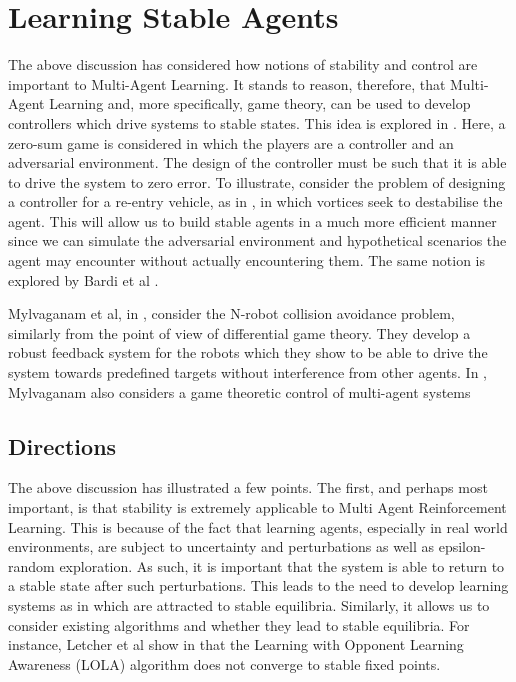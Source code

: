 \documentclass[preprint,8pt]{report}
\begin{document}
\section{Learning Stable Agents}

The above discussion has considered how notions of stability and control are important to Multi-Agent Learning. It stands to reason, therefore, that Multi-Agent Learning and, more specifically, game theory, can be used to develop controllers which drive systems to stable states. This idea is explored in \cite{Marden2018AnnualControl}. Here, a zero-sum game is considered in which the players are a controller and an adversarial environment. The design of the controller must be such that it is able to drive the system to zero error. To illustrate, consider the problem of designing a controller for a re-entry vehicle, as in \cite{Breitner1994ReentryGame}, in which vortices seek to destabilise the agent. This will allow us to build stable agents in a much more efficient manner since we can simulate the adversarial environment and hypothetical scenarios the agent may encounter without actually encountering them. The same notion is explored by Bardi et al \cite{Bardi1991DifferentialDisturbances}.

 Mylvaganam et al, in \cite{Mylvaganam2017AutonomousApproach}, consider the N-robot collision avoidance problem, similarly from the point of view of differential game theory. They develop a robust feedback system for the robots which they show to be able to drive the system towards predefined targets without interference from other agents. In \cite{MylvaganamASystems}, Mylvaganam also considers a game theoretic control of multi-agent systems 

\subsection{Directions}

The above discussion has illustrated a few points. The first, and perhaps most important, is that stability is extremely applicable to Multi Agent Reinforcement Learning. This is because of the fact that learning agents, especially in real world environments, are subject to uncertainty and perturbations as well as epsilon-random exploration. As such, it is important that the system is able to return to a stable state after such perturbations. This leads to the need to develop learning systems as in \cite{Letcher2019DifferentiableMechanics} which are attracted to stable equilibria. Similarly, it allows us to consider existing algorithms and whether they lead to stable equilibria. For instance, Letcher et al show in \cite{LetcherSTABLEGAMES} that the Learning with Opponent Learning Awareness (LOLA) algorithm \cite{Foerster2018LearningAwareness} does not converge to stable fixed points.
\end{document}

